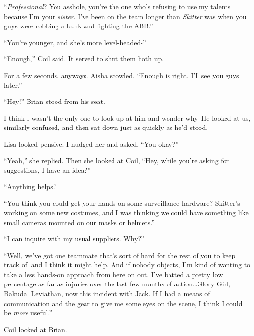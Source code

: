 ``\emph{Professional}?  You asshole, you're the one who's refusing to use my talents because I'm your \emph{sister}.  I've been on the team longer than \emph{Skitter} was when you guys were robbing a bank and fighting the ABB.''



``You're younger, and she's more level-headed-''



``Enough,'' Coil said.  It served to shut them both up.



For a few seconds, anyways.  Aisha scowled.  ``Enough is right.  I'll see you guys later.''



``Hey!''  Brian stood from his seat.



I think I wasn't the only one to look up at him and wonder why.  He looked at us, similarly confused, and then sat down just as quickly as he'd stood.



Lisa looked pensive.  I nudged her and asked, ``You okay?''



``Yeah,'' she replied.  Then she looked at Coil, ``Hey, while you're asking for suggestions, I have an idea?''



``Anything helps.''



``You think you could get your hands on some surveillance hardware?  Skitter's working on some new costumes, and I was thinking we could have something like small cameras mounted on our masks or helmets.''



``I can inquire with my usual suppliers.  Why?''



``Well, we've got one teammate that's sort of hard for the rest of you to keep track of, and I think it might help.  And if nobody objects, I'm kind of wanting to take a less hands-on approach from here on out.  I've batted a pretty low percentage as far as injuries over the last few months of action\ldots Glory Girl, Bakuda, Leviathan, now this incident with Jack.  If I had a means of communication and the gear to give me some eyes on the scene, I think I could be \emph{more} useful.''



Coil looked at Brian.



